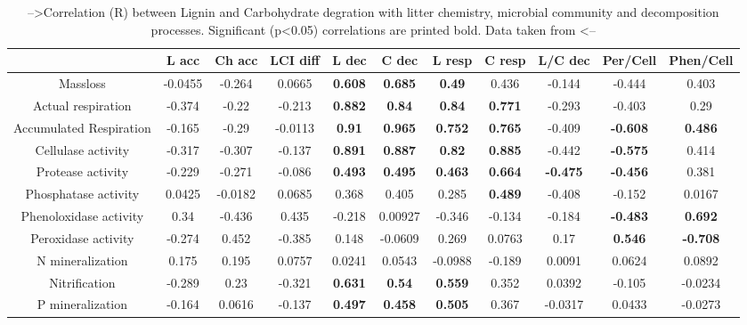 \documentclass[authoryear,preprint,review,12pt]{elsarticle}
\begin{document}
\newpage
\begin{table}[h!]
\begin{center}
\caption{-->Correlation (R) between Lignin and Carbohydrate degration with litter chemistry, microbial community and decomposition processes. Significant (p<0.05) correlations are printed bold. Data taken from \cite{Mooshammer2011, Leitner2011}<--}
\label{corrtable}
{\tiny
\begin{tabular}{ccccccccccc}
  \hline
 & L acc & Ch acc & LCI diff & L dec & C dec & L resp & C resp & L/C dec & Per/Cell & Phen/Cell \\ 
  \hline
Massloss & -0.0455 & -0.264 & 0.0665 & \textbf{ 0.608 } & \textbf{ 0.685 } & \textbf{ 0.49 } & 0.436 & -0.144 & -0.444 & 0.403 \\ 
  Actual respiration & -0.374 & -0.22 & -0.213 & \textbf{ 0.882 } & \textbf{ 0.84 } & \textbf{ 0.84 } & \textbf{ 0.771 } & -0.293 & -0.403 & 0.29 \\ 
  Accumulated Respiration & -0.165 & -0.29 & -0.0113 & \textbf{ 0.91 } & \textbf{ 0.965 } & \textbf{ 0.752 } & \textbf{ 0.765 } & -0.409 & \textbf{ -0.608 } & \textbf{ 0.486 } \\ 
  Cellulase activity & -0.317 & -0.307 & -0.137 & \textbf{ 0.891 } & \textbf{ 0.887 } & \textbf{ 0.82 } & \textbf{ 0.885 } & -0.442 & \textbf{ -0.575 } & 0.414 \\ 
  Protease activity & -0.229 & -0.271 & -0.086 & \textbf{ 0.493 } & \textbf{ 0.495 } & \textbf{ 0.463 } & \textbf{ 0.664 } & \textbf{ -0.475 } & \textbf{ -0.456 } & 0.381 \\ 
  Phosphatase activity & 0.0425 & -0.0182 & 0.0685 & 0.368 & 0.405 & 0.285 & \textbf{ 0.489 } & -0.408 & -0.152 & 0.0167 \\ 
  Phenoloxidase activity & 0.34 & -0.436 & 0.435 & -0.218 & 0.00927 & -0.346 & -0.134 & -0.184 & \textbf{ -0.483 } & \textbf{ 0.692 } \\ 
  Peroxidase activity & -0.274 & 0.452 & -0.385 & 0.148 & -0.0609 & 0.269 & 0.0763 & 0.17 & \textbf{ 0.546 } & \textbf{ -0.708 } \\ 
  N mineralization & 0.175 & 0.195 & 0.0757 & 0.0241 & 0.0543 & -0.0988 & -0.189 & 0.0091 & 0.0624 & 0.0892 \\ 
  Nitrification & -0.289 & 0.23 & -0.321 & \textbf{ 0.631 } & \textbf{ 0.54 } & \textbf{ 0.559 } & 0.352 & 0.0392 & -0.105 & -0.0234 \\ 
  P mineralization & -0.164 & 0.0616 & -0.137 & \textbf{ 0.497 } & \textbf{ 0.458 } & \textbf{ 0.505 } & 0.367 & -0.0317 & 0.0433 & -0.0273 \\ 

\end{tabular}}
\end{center}
\end{table}
\end{document}
